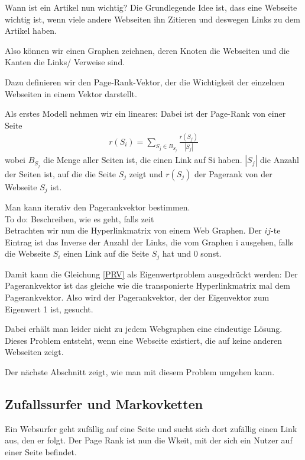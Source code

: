 \documentclass[]{article}
\begin{document}
Wann ist ein Artikel nun wichtig? Die Grundlegende Idee ist, dass eine Webseite wichtig ist, wenn viele andere Webseiten ihn Zitieren und deswegen Links zu dem Artikel haben. 

Also können wir einen Graphen zeichnen, deren Knoten die Webseiten und die Kanten die Links/ Verweise sind. 

 Dazu definieren wir den Page-Rank-Vektor, der die Wichtigkeit der einzelnen Webseiten in einem Vektor darstellt. 
 
 Als erstes Modell nehmen wir ein lineares: Dabei ist der Page-Rank von einer Seite 
 \begin{align}
 \label{PRV}
 	r(S_i)= \sum\limits_{S_j \in B_{S_j}} \frac{r(S_j)}{|S_j|}
 \end{align} 
wobei $B_{S_j}$ die Menge aller Seiten ist, die einen Link auf Si haben. $|S_j|$ die Anzahl der Seiten ist, auf die die Seite $S_j$ zeigt und $r(S_j)$ der Pagerank von der Webseite $S_j$ ist.

Man kann iterativ den Pagerankvektor bestimmen. \\

To do: Beschreiben, wie es geht, falls zeit \\

Betrachten wir nun die Hyperlinkmatrix von einem Web Graphen. Der $ij$-te Eintrag ist das Inverse der Anzahl der Links, die vom Graphen i ausgehen, falls die Webseite $S_i$ einen Link auf die Seite $S_j$ hat und 0 sonst. 

Damit kann die Gleichung \ref{PRV} als Eigenwertproblem ausgedrückt werden: Der Pagerankvektor ist das gleiche wie die transponierte Hyperlinkmatrix mal dem Pagerankvektor. Also wird der Pagerankvektor, der der Eigenvektor zum Eigenwert 1 ist, gesucht. 

Dabei erhält man leider nicht zu jedem Webgraphen eine eindeutige Lösung. Dieses Problem entsteht, wenn eine Webseite existiert, die auf keine anderen Webseiten zeigt. 

Der nächste Abschnitt zeigt, wie man mit diesem Problem umgehen kann. 

\subsection{Zufallssurfer und Markovketten}

Ein Websurfer geht zufällig auf eine Seite und sucht sich dort zufällig einen Link aus, den er folgt. Der Page Rank ist nun die Wkeit, mit der sich ein Nutzer auf einer Seite befindet. 
\end{document}
